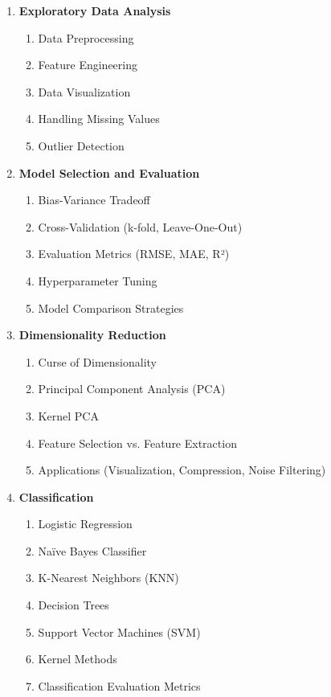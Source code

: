 \documentclass[a4paper,10pt]{article}
\begin{document}
\begin{enumerate}[label=\Roman*.]
    \item \textbf{Exploratory Data Analysis}
    \begin{enumerate}[label=\alph*.]
        \item Data Preprocessing
        \item Feature Engineering
        \item Data Visualization
        \item Handling Missing Values
        \item Outlier Detection
    \end{enumerate}

    \item \textbf{Model Selection and Evaluation}
    \begin{enumerate}[label=\alph*.]
        \item Bias-Variance Tradeoff
        \item Cross-Validation (k-fold, Leave-One-Out)
        \item Evaluation Metrics (RMSE, MAE, R²)
        \item Hyperparameter Tuning
        \item Model Comparison Strategies
    \end{enumerate}

    \item \textbf{Dimensionality Reduction}
    \begin{enumerate}[label=\alph*.]
        \item Curse of Dimensionality
        \item Principal Component Analysis (PCA)
        \item Kernel PCA
        \item Feature Selection vs. Feature Extraction
        \item Applications (Visualization, Compression, Noise Filtering)
    \end{enumerate}

    \item \textbf{Classification}
    \begin{enumerate}[label=\alph*.]
        \item Logistic Regression
        \item Naïve Bayes Classifier
        \item K-Nearest Neighbors (KNN)
        \item Decision Trees
        \item Support Vector Machines (SVM)
        \item Kernel Methods
        \item Classification Evaluation Metrics
    \end{enumerate}


\end{enumerate}
\end{document}
